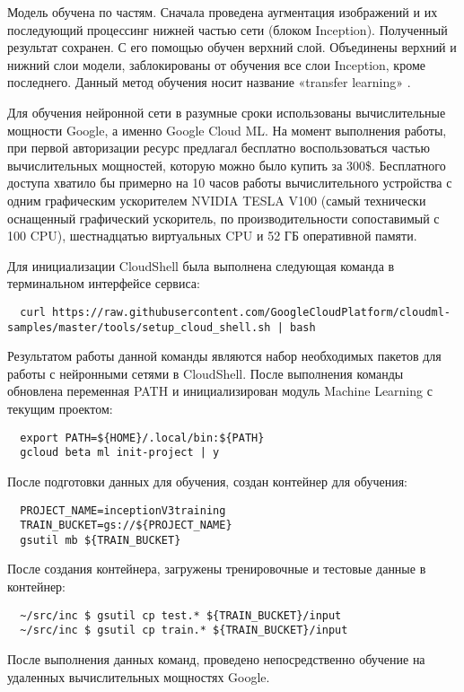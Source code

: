 Модель обучена по частям. 
Сначала проведена аугментация изображений и их последующий процессинг нижней частью сети (блоком Inception). 
Полученный результат сохранен. 
С его помощью обучен верхний слой. 
Объединены верхний и нижний слои модели, заблокированы от обучения все слои Inception, кроме последнего. 
Данный метод обучения носит название «transfer learning» \cite{transfer-learning}.

Для обучения нейронной сети в разумные сроки использованы вычислительные мощности Google, а именно Google Cloud ML. 
На момент выполнения работы, при первой авторизации ресурс предлагал бесплатно воспользоваться частью вычислительных мощностей, которую можно было купить за 300\$. 
Бесплатного доступа хватило бы примерно на 10 часов работы вычислительного устройства с одним графическим ускорителем NVIDIA TESLA V100 (самый технически оснащенный графический ускоритель, по производительности сопоставимый с 100 CPU), шестнадцатью виртуальных CPU и 52 ГБ оперативной памяти.

Для инициализации CloudShell была выполнена следующая команда в терминальном интерфейсе сервиса:
\begin{lstlisting}
  curl https://raw.githubusercontent.com/GoogleCloudPlatform/cloudml-samples/master/tools/setup_cloud_shell.sh | bash
\end{lstlisting}

Результатом работы данной команды являются набор необходимых пакетов для работы с нейронными сетями в CloudShell. 
После выполнения команды обновлена переменная PATH и инициализирован модуль Machine Learning с текущим проектом:
\begin{lstlisting}
  export PATH=${HOME}/.local/bin:${PATH}
  gcloud beta ml init-project | y
\end{lstlisting}

После подготовки данных для обучения, создан контейнер для обучения:
\begin{lstlisting}
  PROJECT_NAME=inceptionV3training
  TRAIN_BUCKET=gs://${PROJECT_NAME}
  gsutil mb ${TRAIN_BUCKET}
\end{lstlisting}


После создания контейнера, загружены тренировочные и тестовые данные в контейнер:
\begin{lstlisting}
  ~/src/inc $ gsutil cp test.* ${TRAIN_BUCKET}/input
  ~/src/inc $ gsutil cp train.* ${TRAIN_BUCKET}/input
\end{lstlisting}

После выполнения данных команд, проведено непосредственно обучение на удаленных вычислительных мощностях Google. 

